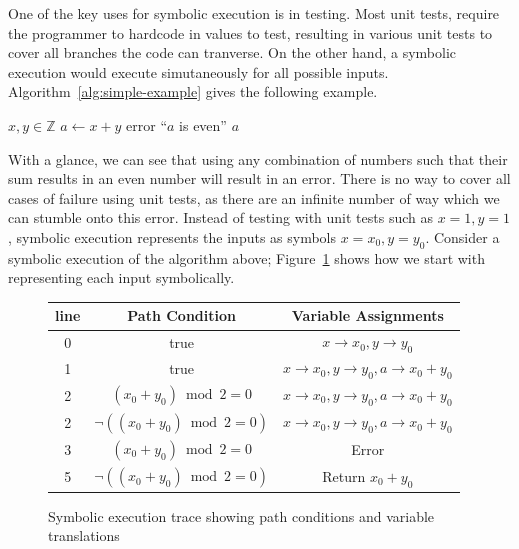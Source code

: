 \documentclass[11pt]{article}
\begin{document}
One of the key uses for symbolic execution is in testing. Most unit tests, require the programmer to hardcode in values to test, resulting in various unit tests to cover all branches the code can tranverse. On the other hand, a symbolic execution would execute simutaneously for all possible inputs. Algorithm~\ref{alg:simple-example} gives the following example.

\begin{algorithm}
    \caption{Algorithm 1}
    \label{alg:simple-example}
    \begin{algorithmic}[1]
    \Require $x, y \in \mathbb{Z}$
    \State $a \gets x + y$
        \State \Return error ``$a$ is even''
    \Else
        \State \Return $a$
    \EndIf
    \end{algorithmic}
\end{algorithm}
    
With a glance, we can see that using any combination of numbers such that their sum results in an even number will result in an error. There is no way to cover all cases of failure using unit tests, as there are an infinite number of way which we can stumble onto this error. Instead of testing with unit tests such as $x=1, y=1$, symbolic execution represents the inputs as symbols $x=x_0, y= y_0$. Consider a symbolic execution of the algorithm above; Figure~\ref{fig:symbolic-trace} shows how we start with representing each input symbolically.

\begin{figure}[H]
    \centering
    \begin{tabular}{|c|c|c|}
        \hline
        line & Path Condition & Variable Assignments \\
        \hline
        0 & true & $x\to x_0, y\to y_0$ \\
        1 & true & $x\to x_0, y\to y_0, a\to x_0+y_0$ \\
        2 & $(x_0 + y_0) \bmod 2 = 0$ & $x\to x_0, y\to y_0, a\to x_0+y_0$ \\
        2 & $\neg((x_0 + y_0) \bmod 2 = 0)$ & $x\to x_0, y\to y_0, a\to x_0+y_0$ \\
        3 & $(x_0 + y_0) \bmod 2 = 0$ & Error \\
        5 & $\neg((x_0 + y_0) \bmod 2 = 0)$ & Return $x_0 + y_0$ \\
        \hline
    \end{tabular}
    \caption{Symbolic execution trace showing path conditions and variable translations}
    \label{fig:symbolic-trace}
\end{figure}
\end{document}

